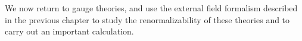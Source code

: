 We now return to gauge theories, and use the external field formalism
described in the previous chapter to study the renormalizability of these
theories and to carry out an important calculation.
